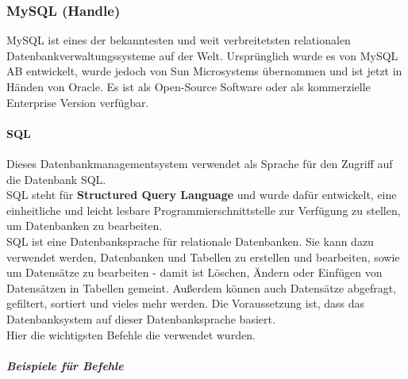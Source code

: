 \subsubsection{MySQL (Handle)}
MySQL ist eines der bekanntesten und weit verbreitetsten relationalen Datenbankverwaltungssysteme auf der Welt. Ursprünglich wurde es von MySQL AB entwickelt, wurde jedoch von Sun Microsystems übernommen und ist jetzt in Händen von Oracle. Es ist als Open-Source Software oder als kommerzielle Enterprise Version verfügbar.\\
\paragraph{SQL\\}
Dieses Datenbankmanagementsystem verwendet als Sprache für den Zugriff auf die Datenbank SQL.\\
SQL steht für \textbf{Structured Query Language} und wurde dafür entwickelt, eine einheitliche und leicht lesbare Programmierschnittstelle zur Verfügung zu stellen, um Datenbanken zu bearbeiten.\\
SQL ist eine Datenbanksprache für relationale Datenbanken. Sie kann dazu verwendet werden, Datenbanken und Tabellen zu erstellen und bearbeiten, sowie um Datensätze zu bearbeiten - damit ist Löschen, Ändern oder Einfügen von Datensätzen in Tabellen gemeint. Außerdem können auch Datensätze abgefragt, gefiltert, sortiert und vieles mehr werden. Die Voraussetzung ist, dass das Datenbanksystem auf dieser Datenbanksprache basiert.\\
Hier die wichtigsten Befehle die verwendet wurden.\\
\subparagraph{Beispiele für Befehle}
